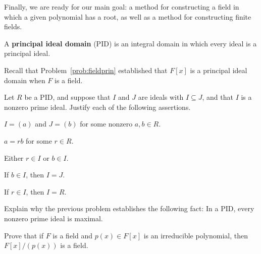 Finally, we are ready for our main goal: a method for constructing a field in which a given polynomial has a root, as well as a method for constructing finite fields.

\begin{definition}
A \textbf{principal ideal domain} (PID) is an integral domain in which every ideal is a principal ideal.
\end{definition}

Recall that Problem~\ref{prob:fieldprin} established that \(F[x]\) is a principal ideal domain when \(F\) is a field.

\begin{problem}
Let \(R\) be a PID, and suppose that \(I\) and \(J\) are ideals with \(I \subseteq J\), and that \(I\) is a nonzero prime ideal. Justify each of the following assertions.
\begin{problemparts}
  \item \(I = (a)\) and \(J = (b)\) for some nonzero \(a,b \in R\).
  \item \(a = rb\) for some \(r \in R\).
  \item Either \(r \in I\) or \(b \in I\).
  \item If \(b \in I\), then \(I = J\).
  \item If \(r \in I\), then \(I = R\).
  \end{problemparts}
\end{problem}

\begin{problem}
Explain why the previous problem establishes the following fact: In a PID, every nonzero prime ideal is maximal.
\end{problem}

\begin{problem}\label{prob:fieldconstruction}
Prove that if \(F\) is a field and \(p(x) \in F[x]\) is an irreducible polynomial, then \(F[x]/(p(x))\) is a field.
\begin{annotation}
\end{annotation}
\end{problem}

